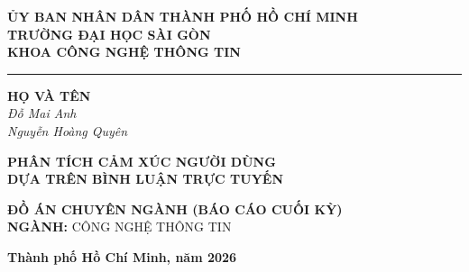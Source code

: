 \begin{titlepage}
\thispagestyle{empty}


\vspace*{2.5cm}

\begin{center}
{\fontsize{14}{16}\selectfont \textbf{ỦY BAN NHÂN DÂN THÀNH PHỐ HỒ CHÍ MINH}}\\[0.4cm]

{\fontsize{14}{16}\selectfont \textbf{TRƯỜNG ĐẠI HỌC SÀI GÒN}}\\[0.4cm]

{\fontsize{14}{16}\selectfont \textbf{KHOA CÔNG NGHỆ THÔNG TIN}}

\vspace{1.5cm}

\rule{6cm}{0.4pt}

\vspace{1.5cm}

{\fontsize{14}{16}\selectfont \textbf{HỌ VÀ TÊN}}\\[0.4cm]

{\fontsize{14}{16}\selectfont \itshape Đỗ Mai Anh}\\[0.3cm]

{\fontsize{14}{16}\selectfont \itshape Nguyễn Hoàng Quyên}

\vspace{1.5cm}

{\fontsize{14}{16}\selectfont \textbf{PHÂN TÍCH CẢM XÚC NGƯỜI DÙNG}}\\[0.4cm]

{\fontsize{14}{16}\selectfont \textbf{DỰA TRÊN BÌNH LUẬN TRỰC TUYẾN}}

\vspace{1.5cm}

{\fontsize{14}{16}\selectfont \textbf{ĐỒ ÁN CHUYÊN NGÀNH (BÁO CÁO CUỐI KỲ)}}\\[0.4cm]

{\fontsize{14}{16}\selectfont \textbf{NGÀNH:} CÔNG NGHỆ THÔNG TIN}

\vfill

{\fontsize{14}{16}\selectfont \textbf{Thành phố Hồ Chí Minh, năm 2026}}

\end{center}
\end{titlepage}
